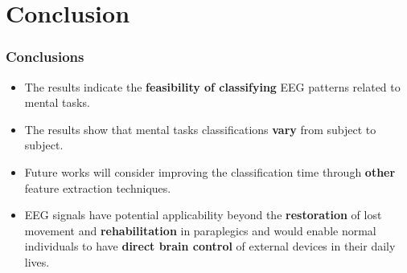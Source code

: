 \section{Conclusion}

\frame
{
\frametitle{Conclusions}
\begin{itemize}
	\item The results indicate the \textbf{feasibility of classifying} EEG patterns related to mental tasks.
	\item The results show that mental tasks classifications \textbf{vary} from subject to subject.
	\item Future works will consider improving the classification time through \textbf{other} feature extraction techniques.
	\item EEG signals have potential applicability beyond the \textbf{restoration} of lost movement and \textbf{rehabilitation} in paraplegics and would enable normal individuals to have \textbf{direct brain control} of external devices in their daily lives.

\end{itemize}

}
